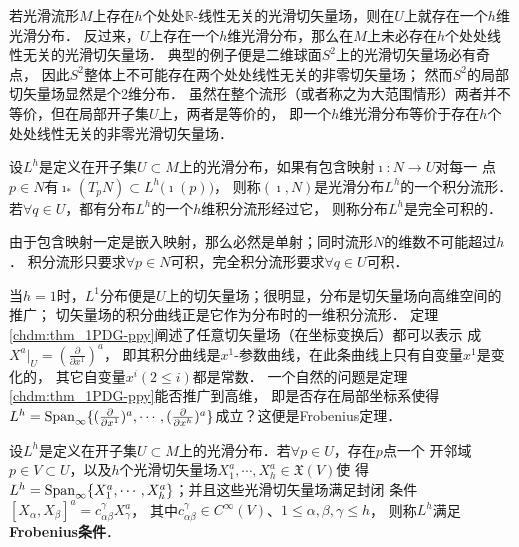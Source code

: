 若光滑流形$M$上存在$h$个处处$\mathbb{R}$-线性无关的光滑切矢量场，则在$U$上就存在一个$h$维光滑分布．
反过来，$U$上存在一个$h$维光滑分布，那么在$M$上未必存在$h$个处处线性无关的光滑切矢量场．
典型的例子便是二维球面$S^2$上的光滑切矢量场必有奇点，
因此$S^2$整体上不可能存在两个处处线性无关的非零切矢量场；
然而$S^2$的局部切矢量场显然是个2维分布．
虽然在整个流形（或者称之为大范围情形）两者并不等价，但在局部开子集$U$上，两者是等价的，
即一个$h$维光滑分布等价于存在$h$个处处线性无关的非零光滑切矢量场．


\begin{definition}\label{chdf:def_solution}
    设$L^h$是定义在开子集$U\subset M$上的光滑分布，如果有包含映射$\imath:N\to U$对每一
    点$p \in N$有$\imath_{*}(T_p N)\subset L^h\bigl(\imath(p)\bigr)$，
    则称$(\imath,N)$是光滑分布$L^h$的一个{\heiti 积分流形}．
    若$\forall q\in U$，都有分布$L^h$的一个$h$维积分流形经过它，
    则称分布$L^h$是{\heiti 完全可积}的．
\end{definition}

由于包含映射一定是嵌入映射，那么必然是单射；同时流形$N$的维数不可能超过$h$．
积分流形只要求$\forall p \in N$可积，完全积分流形要求$\forall q \in U$可积．

当$h=1$时，$L^1$分布便是$U$上的切矢量场；很明显，分布是切矢量场向高维空间的推广；
切矢量场的积分曲线正是它作为分布时的一维积分流形．
定理\ref{chdm:thm_1PDG-ppy}阐述了任意切矢量场（在坐标变换后）都可以表示
成$X^a |_U = (\frac{\partial }{\partial x^1} )^a$，
即其积分曲线是$x^1$-参数曲线，在此条曲线上只有自变量$x^1$是变化的，
其它自变量$x^i(2\leqslant i)$都是常数．
一个自然的问题是定理\ref{chdm:thm_1PDG-ppy}能否推广到高维，
即是否存在局部坐标系使得$L^h={\rm Span}_{\infty}\{(\frac{\partial }{\partial x^1} )^a,
\cdots,(\frac{\partial }{\partial x^h} )^a\}$成立？这便是Frobenius定理．

\begin{definition}\label{chdf:def_frobenius-conditions}
    设$L^h$是定义在开子集$U\subset M$上的光滑分布．若$\forall p\in U$，存在$p$点一个
    开邻域$p\in V\subset U$，以及$h$个光滑切矢量场$X_1^a,\cdots,X^a_h\in \mathfrak{X}(V)$使
    得$L^h={\rm Span}_{\infty}\{ X_1^a,\cdots,X^a_h\}$；并且这些光滑切矢量场满足封闭
    条件$[X_\alpha,X_\beta]^a=c_{\alpha\beta}^{\gamma} X_\gamma^a$，
    其中$c_{\alpha\beta}^{\gamma} \in C^\infty(V)$、$1\leqslant \alpha,\beta,\gamma \leqslant h$，
    则称$L^h$满足{\heiti \bfseries Frobenius条件}．
\end{definition}

